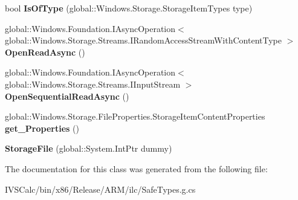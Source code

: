 \begin{DoxyCompactItemize}
bool {\bfseries Is\+Of\+Type} (global\+::\+Windows.\+Storage.\+Storage\+Item\+Types type)
\item 
\mbox{\label{class_windows_1_1_storage_1_1_storage_file_a35c626039408667e2520e113fb58342d}} 
global\+::\+Windows.\+Foundation.\+I\+Async\+Operation$<$ global\+::\+Windows.\+Storage.\+Streams.\+I\+Random\+Access\+Stream\+With\+Content\+Type $>$ {\bfseries Open\+Read\+Async} ()
\item 
\mbox{\label{class_windows_1_1_storage_1_1_storage_file_adc6fa1909202e33273e037fa3347c319}} 
global\+::\+Windows.\+Foundation.\+I\+Async\+Operation$<$ global\+::\+Windows.\+Storage.\+Streams.\+I\+Input\+Stream $>$ {\bfseries Open\+Sequential\+Read\+Async} ()
\item 
\mbox{\label{class_windows_1_1_storage_1_1_storage_file_a9a59e8a2f5bd44c25773662197b786bd}} 
global\+::\+Windows.\+Storage.\+File\+Properties.\+Storage\+Item\+Content\+Properties {\bfseries get\+\_\+\+Properties} ()
\item 
\mbox{\label{class_windows_1_1_storage_1_1_storage_file_a5c85dbe0011a81cc6ef4b8d88c05567e}} 
{\bfseries Storage\+File} (global\+::\+System.\+Int\+Ptr dummy)
\end{DoxyCompactItemize}


The documentation for this class was generated from the following file\+:\begin{DoxyCompactItemize}
\item 
I\+V\+S\+Calc/bin/x86/\+Release/\+A\+R\+M/ilc/Safe\+Types.\+g.\+cs\end{DoxyCompactItemize}
